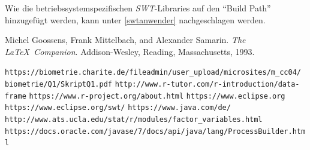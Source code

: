 \documentclass[a4paper, 12pt]{report} %
\begin{document}
Wie die betriebssystemspezifischen \textit{SWT}-Libraries auf den "`Build Path"' hinzugefügt werden, kann unter \ref{swtanwender} nachgeschlagen werden.





%

%
\begin{thebibliography}{9} %
Michel Goossens, Frank Mittelbach, and Alexander Samarin. 
\textit{The \LaTeX\ Companion}. 
Addison-Wesley, Reading, Massachusetts, 1993.
 


\texttt{https://biometrie.charite.de/fileadmin/user\_upload/microsites/m\_cc04/ biometrie/Q1/SkriptQ1.pdf}
\texttt{http://www.r-tutor.com/r-introduction/data-frame}
\texttt{https://www.r-project.org/about.html}
\texttt{https://www.eclipse.org}
\texttt{https://www.eclipse.org/swt/}
\texttt{https://www.java.com/de/}
\texttt{http://www.ats.ucla.edu/stat/r/modules/factor\_variables.html}
\texttt{https://docs.oracle.com/javase/7/docs/api/java/lang/ProcessBuilder.html}


\end{thebibliography}
\end{document}
